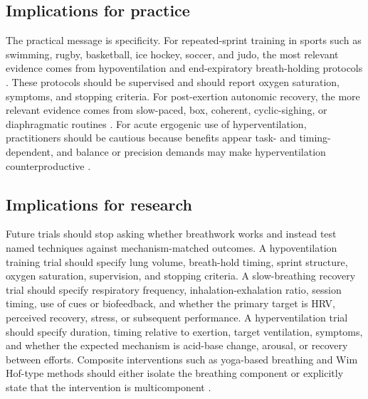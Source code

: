 \documentclass[12pt,a4paper]{article}
\begin{document}
\subsection{Implications for practice}
The practical message is specificity. For repeated-sprint training in sports such as swimming, rugby, basketball, ice hockey, soccer, and judo, the most relevant evidence comes from hypoventilation and end-expiratory breath-holding protocols \parencite{trincat_repeated-sprint_2017,fornasier-santos_repeated-sprint_2018,lapointe_impact_2020,brocherie_effects_2023,ait_ali_braham_m_and_ouchen_y_and_woorons_x_effects_2024,woorons_x_and_faucher_c_and_dufour_sp_and_brocherie_f_and_robach_p_and_connes_p_and_brugniaux_jv_and_verges_s_and_gaston_af_and_millet_g_and_dupuy_o_and_pichon_a_hypoventilation_2024,lorinczi_additional_2025}. These protocols should be supervised and should report oxygen saturation, symptoms, and stopping criteria. For post-exertion autonomic recovery, the more relevant evidence comes from slow-paced, box, coherent, cyclic-sighing, or diaphragmatic routines \parencite{you_m_and_laborde_s_and_ackermann_s_and_borges_u_and_dosseville_f_and_mosley_e_influence_2024,kasap_m_and_aydin_gr_box_2025,jones_effectiveness_2026,chiron_f_and_guloren_b_and_erblang_m_and_poirier_c_and_elbaz_m_and_servonnet_a_and_gaudin_m_and_le_coz_c_and_lopes_p_and_chennaoui_m_and_hanon_c_and_leger_d_and_thomas_c_exploring_2026}. For acute ergogenic use of hyperventilation, practitioners should be cautious because benefits appear task- and timing-dependent, and balance or precision demands may make hyperventilation counterproductive \parencite{sakamoto_a_and_naito_h_and_chow_cm_hyperventilation_2014,sakamoto_hyperventilation-aided_2020,malakhov_m_and_makarenkova_e_and_melnikov_a_influence_2014,fesseler_l_and_patzak_a_and_heinz_v_and_le_ns_and_opatz_o_and_pilz_n_and_bothe_tl_effect_2026}.

\subsection{Implications for research}
Future trials should stop asking whether breathwork works and instead test named techniques against mechanism-matched outcomes. A hypoventilation training trial should specify lung volume, breath-hold timing, sprint structure, oxygen saturation, supervision, and stopping criteria. A slow-breathing recovery trial should specify respiratory frequency, inhalation-exhalation ratio, session timing, use of cues or biofeedback, and whether the primary target is HRV, perceived recovery, stress, or subsequent performance. A hyperventilation trial should specify duration, timing relative to exertion, target ventilation, symptoms, and whether the expected mechanism is acid-base change, arousal, or recovery between efforts. Composite interventions such as yoga-based breathing and Wim Hof-type methods should either isolate the breathing component or explicitly state that the intervention is multicomponent \parencite{bahensky_p_and_bunc_v_and_malatova_r_and_marko_d_and_grosicki_gj_and_schuster_j_impact_2021,citherlet_t_and_crettaz_von_roten_f_and_kayser_b_and_guex_k_acute_2021,marko_d_and_bahensky_p_and_bunc_v_and_grosicki_gj_and_vondrasek_jd_does_2022,fox_n_and_biddell_h_and_king_j_semi-randomised_2025}.
\end{document}
